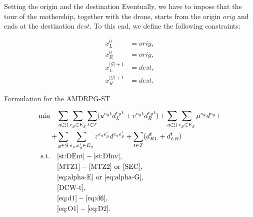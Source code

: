 \documentclass[slidestop,usepdftitle=false,10pt]{beamer}
\begin{document}
	\begin{frame}{Setting the origin and the destination}
	    Eventually, we have to impose that the tour of the mothership, together with the drone, starts from the origin $orig$ and ends at the destination $dest$. To this end, we define the following constraints:

        \begin{align*}
        x_L^0 & =  orig,  \tag{ORIG$_1$} \label{eq:O1} \\
        x_R^0 & =  orig,  \tag{ORIG$_2$} \label{eq:O2} \\
        x_L^{|\mathcal{G}|+1} & =  dest,  \tag{DEST$_1$} \label{eq:D1} \\
        x_R^{|\mathcal{G}|+1} & =  dest.  \tag{DEST$_2$} \label{eq:D2} 
        \end{align*}

	\end{frame}
	
	\begin{frame}{Formulation for the AMDRPG-ST}
	
	\begin{align*}
	    \text{min}\quad &\sum_{g\in\mathcal G}\sum_{e_g\in E_g}\sum_{t\in T} (u^{e_gt}d_L^{e_gt} + v^{e_gt}d_R^{e_gt}) + \sum_{g\in\mathcal G}\sum_{e_g\in E_g} \mu^{e_g}d^{e_g} + \\
	    + & \sum_{g\in\mathcal G}\sum_{e_g,e^\prime_g\in E_g}z^{e_ge^\prime_g}d^{e_ge^\prime_g} + \sum_{t\in T} (d_{RL}^t + d_{LR}^t) \\
	    \text{s.t.}\quad & \eqref{st:DEnt}-\eqref{st:DInv}, \\
	    & \eqref{MTZ1} - \eqref{MTZ2} \text{ or } \eqref{SEC}, \\
	    & \eqref{eq:alpha-E} \text{ or } \eqref{eq:alpha-G}, \\
	    & \eqref{DCW-t}, \\
	    & \eqref{eq:d1}-\eqref{eq:d6}, \\
	    & \eqref{eq:O1}-\eqref{eq:D2}.
	\end{align*}
	    
	\end{frame}
	
\end{document}
